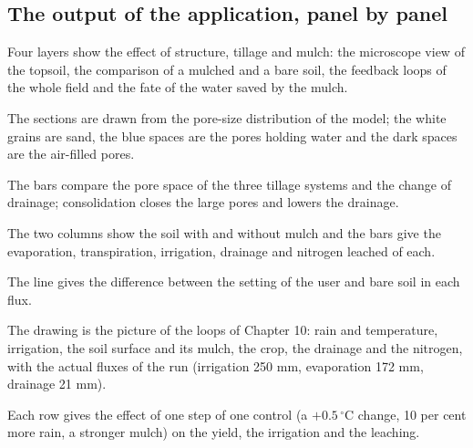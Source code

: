 \subsection{The output of the application, panel by panel}
Four layers show the effect of structure, tillage and mulch: the microscope view of the topsoil, the comparison of a mulched and a bare soil, the feedback loops of the whole field and the fate of the water saved by the mulch.

The sections are drawn from the pore-size distribution of the model; the white grains are sand, the blue spaces are the pores holding water and the dark spaces are the air-filled pores.


The bars compare the pore space of the three tillage systems and the change of drainage; consolidation closes the large pores and lowers the drainage.


The two columns show the soil with and without mulch and the bars give the evaporation, transpiration, irrigation, drainage and nitrogen leached of each.


The line gives the difference between the setting of the user and bare soil in each flux.


The drawing is the picture of the loops of Chapter 10: rain and temperature, irrigation, the soil surface and its mulch, the crop, the drainage and the nitrogen, with the actual fluxes of the run (irrigation 250 mm, evaporation 172 mm, drainage 21 mm).


Each row gives the effect of one step of one control (a $+0.5\,^\circ$C change, 10 per cent more rain, a stronger mulch) on the yield, the irrigation and the leaching.


